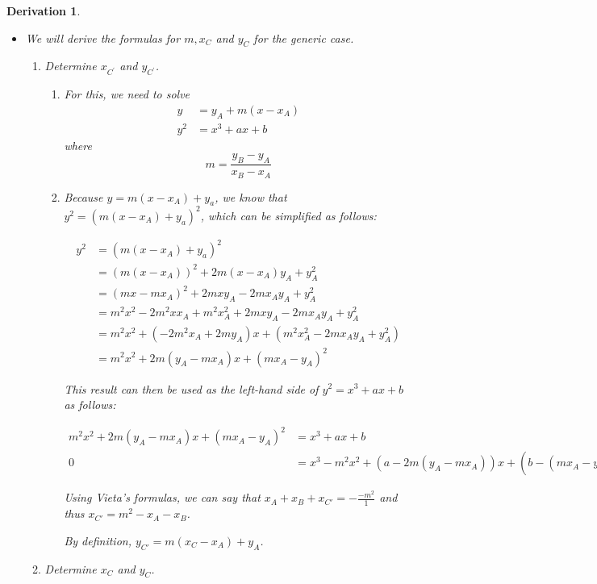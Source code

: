 \documentclass{article}%
\newtheorem{derivation}[theorem]{Derivation}
\begin{document}
\begin{derivation}
\ 

\begin{itemize}
\item We will derive the formulas for $m,x_{C}$ and $y_{C}$ for the generic
case.

\begin{enumerate}
\item Determine $x_{C^{\prime}}$ and $y_{C^{\prime}}$.

\begin{enumerate}
\item For this, we need to solve%
\begin{align*}
y  &  =y_{A}+m\left(  x-x_{A}\right) \\
y^{2}  &  =x^{3}+ax+b
\end{align*}
where%
\[
m=\frac{y_{B}-y_{A}}{x_{B}-x_{A}}%
\]

\item Because $y=m(x-x_A)+y_a$, we know that $y^2=(m(x-x_A)+y_a)^2$, which can be simplified as follows:

\begin{align*}
    y^2&=(m(x-x_A)+y_a)^2\\
    &=(m(x-x_A))^2+2m(x-x_A)y_A+y_A^2\\
    &=(mx-mx_A)^2+2mxy_A-2mx_Ay_A+y_A^2\\
    &=m^2x^2-2m^2xx_A+m^2x_A^2+2mxy_A-2mx_Ay_A+y_A^2\\
    &=m^2x^2+(-2m^2x_A+2my_A)x+(m^2x_A^2-2mx_Ay_A+y_A^2)\\
    &=m^2x^2+2m(y_A-mx_A)x+(mx_A-y_A)^2
\end{align*}

This result can then be used as the left-hand side of $y^2=x^3+ax+b$ as follows:

\begin{align*}
    m^2x^2+2m(y_A-mx_A)x+(mx_A-y_A)^2&=x^3+ax+b\\
    0 &= x^3-m^2x^2+(a-2m(y_A-mx_A))x+(b-(mx_A-y_A)^2)
\end{align*}

Using Vieta's formulas, we can say that $x_A+x_B+x_{C'}=-\frac{-m^2}{1}$ and thus $x_{C'}=m^2-x_A-x_B$.

By definition, $y_{C'}=m(x_C-x_A)+y_A$.

\end{enumerate}

\item Determine $x_{C}$ and $y_{C}$.


\end{enumerate}
\end{itemize}
\end{derivation}
\end{document}
